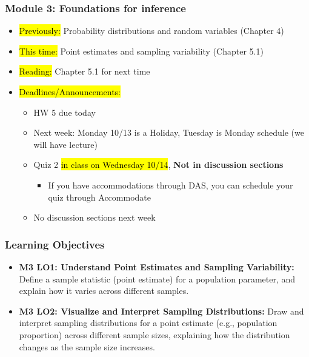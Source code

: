
\begin{frame}
    \frametitle{Module 3: Foundations for inference}
    \begin{itemize}
        \item \hl{Previously: }Probability distributions and random variables (Chapter 4)
        \item \hl{This time: }Point estimates and sampling variability (Chapter 5.1)
        \item \hl{Reading: }Chapter 5.1 for next time
        \item \hl{Deadlines/Announcements: }
        \begin{itemize}
            \item HW 5 due today
            \item Next week: Monday 10/13 is a Holiday, Tuesday is Monday schedule (we will have lecture)
            \item Quiz 2 \hl{in class on Wednesday 10/14}, \textbf{Not in discussion sections}
            \begin{itemize}
                \item If you have accommodations through DAS, you can schedule your quiz through Accommodate
            \end{itemize}
            \item No discussion sections next week
        \end{itemize}
    \end{itemize}
    
\end{frame}

\begin{frame}
\frametitle{Learning Objectives}
\begin{itemize}
    \item \textbf{M3 LO1: Understand Point Estimates and Sampling Variability:} Define a sample statistic (point estimate) for a population parameter, and explain how it varies across different samples. 
    \item \textbf{M3 LO2: Visualize and Interpret Sampling Distributions:} Draw and interpret sampling distributions for a point estimate (e.g., population proportion) across different sample sizes, explaining how the distribution changes as the sample size increases. 
\end{itemize}
\end{frame}
